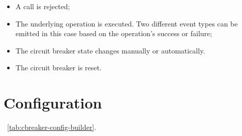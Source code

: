 \begin{itemize}
    \item A call is rejected;
    \item The underlying operation is executed.
    Two different event types can be emitted in this case based on the operation's success or failure;
    \item The circuit breaker state changes manually or automatically.
    \item The circuit breaker is reset.
\end{itemize}


\section{Configuration}\label{sec:cbreaker-configuration}

~\ref{tab:cbreaker-config-builder}.

